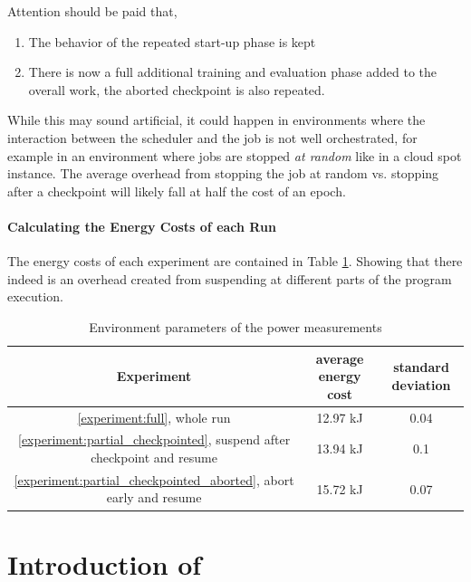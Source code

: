 Attention should be paid that,

\begin{enumerate}
    \item The behavior of the repeated start-up phase is kept
    \item There is now a full additional training and evaluation phase added to the overall work, the aborted checkpoint is also repeated.
\end{enumerate}

While this may sound artificial, it could happen in environments where the interaction between the scheduler and the job is not well orchestrated, for example in an environment where jobs are stopped \emph{at random} like in a cloud spot instance. 
The average overhead from stopping the job at random vs. stopping after a checkpoint will likely fall at half the cost of an epoch.

\paragraph{Calculating the Energy Costs of each Run}

The energy costs of each experiment are contained in Table \ref{tab:experiment_overhead}. 
Showing that there indeed is an overhead created from suspending at different parts of the program execution.

\begin{table}[h!]
    \centering
    \begin{tabular}{|c|c|c|}
    \hline
        Experiment & average energy cost & standard deviation \\ \hline
        \ref{experiment:full}, whole run &  12.97 kJ & 0.04 \\ \hline
        \ref{experiment:partial_checkpointed}, suspend after checkpoint and resume &  13.94  kJ & 0.1 \\ \hline
        \ref{experiment:partial_checkpointed_aborted}, abort early and resume &  15.72 kJ & 0.07 \\ \hline
    \end{tabular}
    \caption{Environment parameters of the power measurements}
\label{tab:experiment_overhead}
\end{table}


\section{Introduction of \modelname} \label{sec:improving_the_model}


